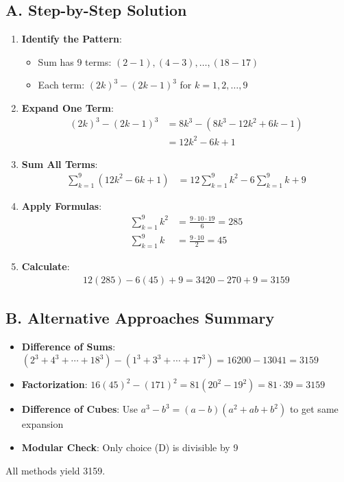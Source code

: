 \documentclass[12pt]{article}
\begin{document}
\begin{solutionbox}
\subsection*{A. Step-by-Step Solution}
\begin{enumerate}[leftmargin=*]
    \item \textbf{Identify the Pattern}: 
    \begin{itemize}
        \item Sum has 9 terms: $(2-1), (4-3), \ldots, (18-17)$
        \item Each term: $(2k)^3 - (2k-1)^3$ for $k = 1, 2, \ldots, 9$
    \end{itemize}
    
    \item \textbf{Expand One Term}: 
    \begin{align*}
    (2k)^3 - (2k-1)^3 &= 8k^3 - (8k^3 - 12k^2 + 6k - 1)\\
    &= 12k^2 - 6k + 1
    \end{align*}
    
    \item \textbf{Sum All Terms}: 
    \begin{align*}
    \sum_{k=1}^{9} (12k^2 - 6k + 1) &= 12\sum_{k=1}^{9} k^2 - 6\sum_{k=1}^{9} k + 9
    \end{align*}
    
    \item \textbf{Apply Formulas}: 
    \begin{align*}
    \sum_{k=1}^{9} k^2 &= \frac{9 \cdot 10 \cdot 19}{6} = 285\\
    \sum_{k=1}^{9} k &= \frac{9 \cdot 10}{2} = 45
    \end{align*}
    
    \item \textbf{Calculate}: 
    \begin{align*}
    12(285) - 6(45) + 9 = 3420 - 270 + 9 = 3159
    \end{align*}
\end{enumerate}

\subsection*{B. Alternative Approaches Summary}
\begin{itemize}[leftmargin=*]
    \item \textbf{Difference of Sums}: $(2^3+4^3+\cdots+18^3) - (1^3+3^3+\cdots+17^3) = 16200 - 13041 = 3159$
    \item \textbf{Factorization}: $16(45)^2 - (171)^2 = 81(20^2 - 19^2) = 81 \cdot 39 = 3159$
    \item \textbf{Difference of Cubes}: Use $a^3-b^3 = (a-b)(a^2+ab+b^2)$ to get same expansion
    \item \textbf{Modular Check}: Only choice (D) is divisible by 9
\end{itemize}

All methods yield 3159.
\end{solutionbox}
\end{document}
